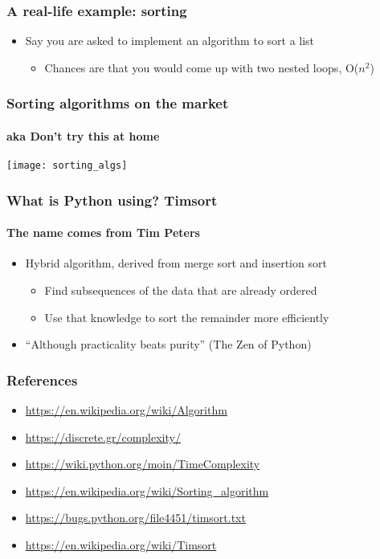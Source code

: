 \documentclass[9pt]{beamer}
\begin{document}
\begin{frame}
  \frametitle{A real-life example: sorting}
  

  \begin{itemize}
  \item Say you are asked to implement an algorithm to sort a list
    \begin{itemize}
    \item Chances are that you would come up with two nested loops, O($n^2$)
    \end{itemize}
  \end{itemize}
\end{frame}


\begin{frame}
  \frametitle{Sorting algorithms on the market}
  \framesubtitle{aka Don't try this at home}
  \texttt{[image: sorting\_algs]}
\end{frame}


\begin{frame}
  \frametitle{What is Python using? Timsort}
  \framesubtitle{The name comes from Tim Peters}
  

  \bigskip
  
  \begin{itemize}
  \item Hybrid algorithm, derived from merge sort and insertion sort
    \begin{itemize}
    \item Find subsequences of the data that are already ordered
    \item Use that knowledge to sort the remainder more efficiently
    \end{itemize}
  \item ``Although practicality beats purity'' (The Zen of Python)
  \end{itemize}
\end{frame}


\begin{frame}
  \frametitle{References}
  \scriptsize
  \begin{itemize}
  \item \url{https://en.wikipedia.org/wiki/Algorithm}
  \item \url{https://discrete.gr/complexity/}
  \item \url{https://wiki.python.org/moin/TimeComplexity}
  \item \url{https://en.wikipedia.org/wiki/Sorting_algorithm}
  \item \url{https://bugs.python.org/file4451/timsort.txt}
  \item \url{https://en.wikipedia.org/wiki/Timsort}
  \end{itemize}
\end{frame}
\end{document}
